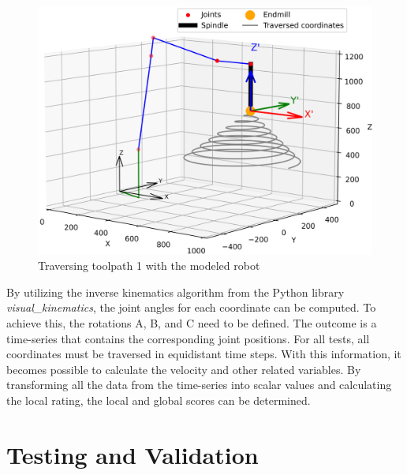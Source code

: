 \begin{figure}[H]
	\centerline{\includegraphics[width=1\textwidth]{figures/robotANDpath1.png}}
	\caption{Traversing toolpath 1 with the modeled robot}
	\label{TP1robot}
\end{figure}

By utilizing the inverse kinematics algorithm from the Python library \textit{visual\_kinematics}, the joint angles for each coordinate can be computed. To achieve this, the rotations A, B, and C need to be defined. The outcome is a time-series that contains the corresponding joint positions. For all tests, all coordinates must be traversed in equidistant time steps. With this information, it becomes possible to calculate the velocity and other related variables. By transforming all the data from the time-series into scalar values and calculating the local rating, the local and global scores can be determined.

\section{Testing and Validation}%

